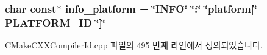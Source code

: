 \subsubsection[{\texorpdfstring{info\+\_\+platform}{info_platform}}]{\setlength{\rightskip}{0pt plus 5cm}char const$\ast$ info\+\_\+platform = \char`\"{}I\+N\+FO\char`\"{} \char`\"{}\+:\char`\"{} \char`\"{}platform\mbox{[}\char`\"{} P\+L\+A\+T\+F\+O\+R\+M\+\_\+\+ID \char`\"{}\mbox{]}\char`\"{}}\hypertarget{avdecc-lib_2jdksavdecc-c_2_c_make_files_23_85_81_2_compiler_id_c_x_x_2_c_make_c_x_x_compiler_id_8cpp_a2321403dee54ee23f0c2fa849c60f7d4}{}\label{avdecc-lib_2jdksavdecc-c_2_c_make_files_23_85_81_2_compiler_id_c_x_x_2_c_make_c_x_x_compiler_id_8cpp_a2321403dee54ee23f0c2fa849c60f7d4}


C\+Make\+C\+X\+X\+Compiler\+Id.\+cpp 파일의 495 번째 라인에서 정의되었습니다.

